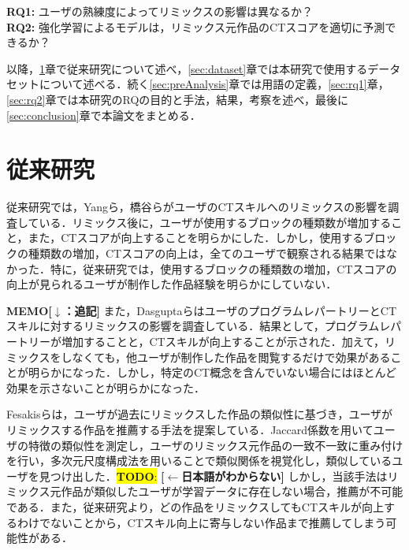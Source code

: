 \documentclass[submit,techrep,noauthor]{ipsj}
\newcommand{\todo}[1]{\colorbox{yellow}{{\bf TODO}:}{\color{red} {\textbf{[#1]}}}}
\newcommand{\memo}[1]{\colorbox{magenta!30}{\textbf{MEMO}}{\color{red!50}\textbf{[#1]}}}
\begin{document}
\noindent\textbf{RQ1: }ユーザの熟練度によってリミックスの影響は異なるか？\\
\noindent\textbf{RQ2: }強化学習によるモデルは，リミックス元作品のCTスコアを適切に予測できるか？


以降，\ref{sec:related}章で従来研究について述べ，\ref{sec:dataset}章では本研究で使用するデータセットについて述べる．続く\ref{sec:preAnalysis}章では用語の定義，\ref{sec:rq1}章，\ref{sec:rq2}章では本研究のRQの目的と手法，結果，考察を述べ，最後に\ref{sec:conclusion}章で本論文をまとめる．

\section{従来研究}
\label{sec:related}

従来研究では，Yangら\cite{10.1145/2724660.2724674}，橋谷ら\cite{hashitani2022scratch}がユーザのCTスキルへのリミックスの影響を調査している．リミックス後に，ユーザが使用するブロックの種類数が増加すること，また，CTスコアが向上することを明らかにした．しかし，使用するブロックの種類数の増加，CTスコアの向上は，全てのユーザで観察される結果ではなかった．特に，従来研究では，使用するブロックの種類数の増加，CTスコアの向上が見られるユーザが制作した作品経験を明らかにしていない．

\memo{$\downarrow$：追記}
また，DasguptaらはユーザのプログラムレパートリーとCTスキルに対するリミックスの影響を調査している\cite{10.1145/2818048.2819984}．結果として，プログラムレパートリーが増加することと，CTスキルが向上することが示された．加えて，リミックスをしなくても，他ユーザが制作した作品を閲覧するだけで効果があることが明らかになった．しかし，特定のCT概念を含んでいない場合にはほとんど効果を示さないことが明らかになった．

Fesakisらは，ユーザが過去にリミックスした作品の類似性に基づき，ユーザがリミックスする作品を推薦する手法を提案している\cite{fesakis2009proposing}．Jaccard係数を用いてユーザの特徴の類似性を測定し，ユーザのリミックス元作品の一致不一致に重み付けを行い，多次元尺度構成法を用いることで類似関係を視覚化し，類似しているユーザを見つけ出した．\todo{$\leftarrow$日本語がわからない}
しかし，当該手法はリミックス元作品が類似したユーザが学習データに存在しない場合，推薦が不可能である．また，従来研究\cite{10.1145/2724660.2724674}\cite{hashitani2022scratch}\cite{10.1145/2818048.2819984}より，どの作品をリミックスしてもCTスキルが向上するわけでないことから，CTスキル向上に寄与しない作品まで推薦してしまう可能性がある．
\end{document}
